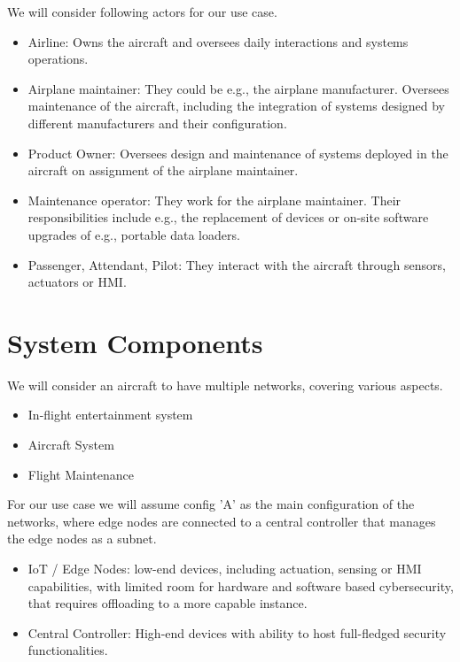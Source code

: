 We will consider following actors for our use case.

\begin{itemize}
	\item Airline:
	      Owns the aircraft and oversees daily interactions and systems operations.
	\item Airplane maintainer: They could be e.g., the airplane manufacturer. Oversees maintenance of the aircraft,
	      including the integration of systems designed by different manufacturers and their configuration.
	\item Product Owner: Oversees design and maintenance of systems deployed in the aircraft on assignment of the
	      airplane maintainer.
	\item Maintenance operator: They work for the airplane maintainer. Their responsibilities include e.g.,
	      the replacement of devices or on-site software upgrades of e.g., portable data loaders.
	\item Passenger, Attendant, Pilot: They interact with the aircraft through sensors, actuators or HMI.
\end{itemize}


\section{System Components} %
\label{sec:System Components}

We will consider an aircraft to have multiple networks, covering various aspects.
\begin{itemize}
	\item In-flight entertainment system
	\item Aircraft System
	\item Flight Maintenance
\end{itemize}

For our use case we will assume config 'A' as the main configuration of the networks, where edge nodes are connected to
a central controller that manages the edge nodes as a subnet.
\begin{itemize}
	\item IoT / Edge Nodes: low-end devices, including actuation, sensing or HMI capabilities, with limited
	      room for hardware and software based cybersecurity, that requires offloading to a more capable
	      instance.
	\item Central Controller: High-end devices with ability to host full-fledged security functionalities.
\end{itemize}

